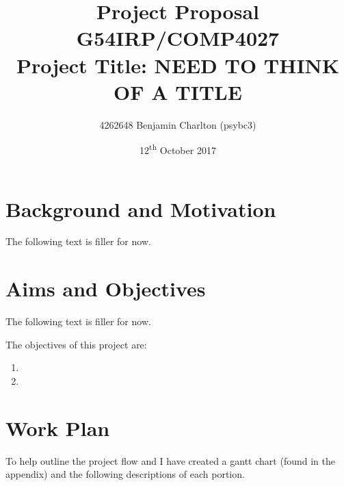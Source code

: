 \documentclass[a4paper]{article}
\begin{document}
\title{
    Project Proposal
    \\ \large{G54IRP/COMP4027}
    \\ \large{Project Title: NEED TO THINK OF A TITLE}\vspace{-3ex}}
\author{4262648 Benjamin Charlton (psybc3)}
\date{\vspace{-2ex}12\textsuperscript{th} October 2017}
\maketitle

\section{Background and Motivation}
The following text is filler for now.
\par
\lipsum[1-7]

\section{Aims and Objectives}
The following text is filler for now.
\par
\lipsum[1-5]
\bigbreak
The objectives of this project are:
\begin{enumerate}
    \item \lipsum[1]
    \item \lipsum[1]
\end{enumerate}

\section{Work Plan}
To help outline the project flow and I have created a gantt chart (found in the appendix) and the following descriptions of each portion.
\end{document}
